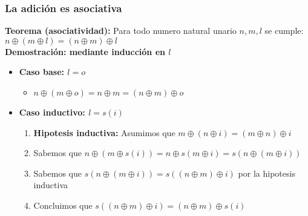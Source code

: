 \documentclass{beamer}
\begin{document}
\begin{frame}
    \frametitle{La adici\'on es asociativa}
    {\bf Teorema (asociatividad):} Para todo numero natural unario $n,m,l$ se cumple:
    $n\oplus(m\oplus l)=(n\oplus m)\oplus l$
    \\[1cm]
    {\bf Demostraci\'on: mediante inducci\'on en $l$}
    \begin{itemize}
        \item{{\bf Caso base: $l=o$}
        \begin{itemize}
            \item{$n\oplus (m\oplus o)=n \oplus m = (n \oplus m)\oplus o$}
        \end{itemize}
        }
        \item{{\bf Caso inductivo: $l=s(i)$}
        \begin{enumerate}
            \item{{\bf Hipotesis inductiva: }Asumimos que $m\oplus (n\oplus i)=(m\oplus n)\oplus i$}
            \item{Sabemos que $n\oplus(m\oplus s(i))=n\oplus s(m\oplus i)=s(n\oplus(m\oplus i))$}
            \item{Sabemos que $s(n\oplus(m\oplus i))=s((n\oplus m)\oplus i)$ por la hipotesis inductiva}
            \item{Concluimos que $s((n\oplus m)\oplus i)=(n\oplus m)\oplus s(i)$}
        \end{enumerate}
        }
    \end{itemize}
\end{frame}
\end{document}
